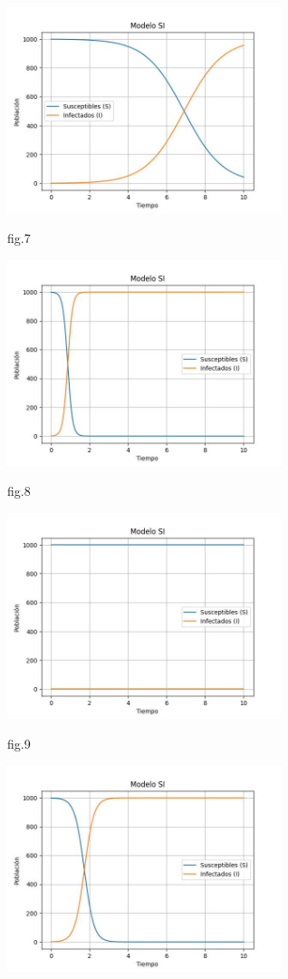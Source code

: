    \begin{center}
        
    \includegraphics[width=0.6\textwidth]{images/plt02.jpg}
    \begin{center}
        fig.7
    \end{center} 
    \includegraphics[width=0.6\textwidth]{images/plt12.jpg}
    \begin{center}
        fig.8
    \end{center} 
    \includegraphics[width=0.6\textwidth]{images/plt22.jpg}
    \begin{center}
        fig.9
    \end{center} 
    \includegraphics[width=0.6\textwidth]{images/plt32.jpg}
    

\end{center}

